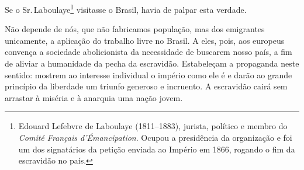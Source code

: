 \begin{linenumbers}
 Se o Sr.\,Laboulaye\footnote{ Edouard Lefebvre de Laboulaye (1811--1883), 
jurista, político e membro do \textit{Comité Français d'Émancipation}. Ocupou a
presidência da organização e foi um dos signatários da petição enviada ao Império 
em 1866, rogando o fim da escravidão no país.} visitasse o Brasil, havia de palpar esta verdade. 

 Não depende de nós, que não fabricamos população, mas dos emigrantes
unicamente, a aplicação do trabalho livre no Brasil. A eles, pois, aos
europeus convença a sociedade abolicionista da necessidade de buscarem
nosso país, a fim de aliviar a humanidade da pecha da escravidão.
Estabeleçam a propaganda neste sentido: mostrem ao interesse individual
o império como ele é e darão ao grande princípio da liberdade um
triunfo generoso e incruento. A escravidão cairá sem arrastar à miséria
e à anarquia uma nação jovem.

\end{linenumbers}

\sectionitem

